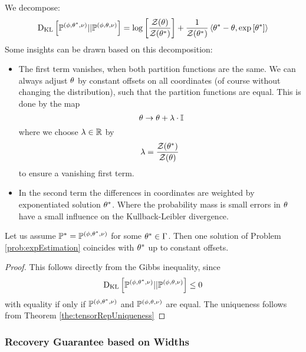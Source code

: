 We decompose:
\begin{align}
	\mathrm{D}_{\mathrm{KL}}\left[ \mathbb{P}^{(\phi,\theta^*,\nu)} || \mathbb{P}^{(\phi,\theta,\nu)} \right] 
	= \log\left[\frac{\mathcal{Z}{\left(\theta\right)}}{\mathcal{Z}{\left(\theta^*\right)}}\right] 
	+ \frac{1}{\mathcal{Z}{\left(\theta^*\right)}} \braket{\theta^*-\theta,\mathrm{exp}\left[\theta^*\right]}
\end{align}
Some insights can be drawn based on this decomposition:
\begin{itemize}
	\item The first term vanishes, when both partition functions are the same.
		We can always adjust $\theta$ by constant offsets on all coordinates (of course without changing the distribution), such that the partition functions are equal.
		This is done by the map
			\[ \canparam \rightarrow \canparam + \lambda \cdot \ones \]
		where we choose $\lambda\in\mathbb{R}$ by
			\[ \lambda = \frac{\mathcal{Z}{\left(\theta^*\right)}}{\mathcal{Z}{\left(\theta\right)}} \]
		to ensure a vanishing first term.		
	\item In the second term the differences in coordinates are weighted by exponentiated solution $\theta^*$.
		Where the probability mass is small errors in $\theta$ have a small influence on the Kullback-Leibler divergence.
\end{itemize}


\begin{theorem}
	Let us assume $\mathbb{P}^* = \mathbb{P}^{(\phi,\theta^*,\nu)}$ for some $\theta^*\in\Gamma$. 
	Then one solution of Problem \ref{prob:expEstimation} coincides with $\theta^*$ up to constant offsets.
\end{theorem}
\begin{proof}
	This follows directly from the Gibbs inequality, since 
	\begin{align}
		\mathrm{D}_{\mathrm{KL}}\left[ \mathbb{P}^{(\phi,\theta^*,\nu)} || \mathbb{P}^{(\phi,\theta,\nu)} \right] \leq 0
	\end{align}
	with equality if only if $\mathbb{P}^{(\phi,\theta^*,\nu)}$ and $\mathbb{P}^{(\phi,\theta,\nu)}$ are equal.
	The uniqueness follows from Theorem \ref{the:tensorRepUniqueness}
\end{proof}









\subsubsection{Recovery Guarantee based on Widths}

